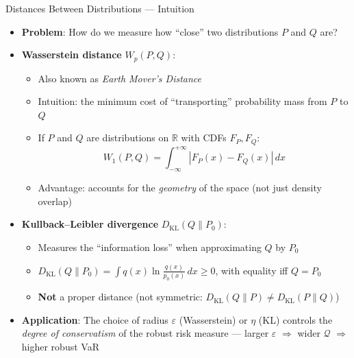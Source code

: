 \documentclass[9pt, aspectratio=169, t]{beamer}
\theoremstyle{definition}
\newcommand{\R}{\mathbb{R}}
\begin{document}
\begin{frame}{Distances Between Distributions --- Intuition}
\begin{itemize}\setlength\itemsep{3pt}
\item \textbf{Problem}: How do we measure how ``close'' two distributions $P$ and $Q$ are?
\item \textbf{Wasserstein distance} $W_p(P, Q)$:
\begin{itemize}
    \item Also known as \textit{Earth Mover's Distance}
    \item Intuition: the minimum cost of ``transporting'' probability mass from $P$ to $Q$
    \item If $P$ and $Q$ are distributions on $\R$ with CDFs $F_P, F_Q$:
    \[
    W_1(P, Q) = \int_{-\infty}^{+\infty} |F_P(x) - F_Q(x)|\, dx
    \]
    \item Advantage: accounts for the \emph{geometry} of the space (not just density overlap)
\end{itemize}
\item \textbf{Kullback--Leibler divergence} $D_{\text{KL}}(Q \| P_0)$:
\begin{itemize}
    \item Measures the ``information loss'' when approximating $Q$ by $P_0$
    \item $D_{\text{KL}}(Q \| P_0) = \int q(x) \ln \frac{q(x)}{p_0(x)}\, dx \geq 0$, with equality iff $Q = P_0$
    \item \textbf{Not} a proper distance (not symmetric: $D_{\text{KL}}(Q\|P) \neq D_{\text{KL}}(P\|Q)$)
\end{itemize}
\item \textbf{Application}: The choice of radius $\varepsilon$ (Wasserstein) or $\eta$ (KL) controls the \emph{degree of conservatism} of the robust risk measure --- larger $\varepsilon$ $\Rightarrow$ wider $\mathcal{Q}$ $\Rightarrow$ higher robust VaR
\end{itemize}
\end{frame}
\end{document}
